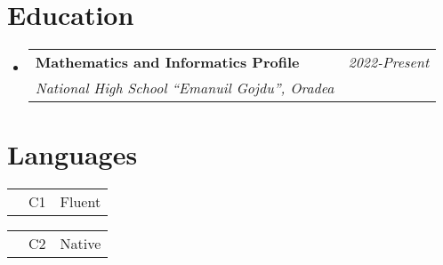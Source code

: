 \documentclass[a4paper,11pt]{article}
\makeatletter
\newcommand{\resumeSubheading}[4]{
\vspace{0.5mm}\item
    \begin{tabular*}{0.98\textwidth}[t]{l@{\extracolsep{\fill}}r}
        \textbf{#1} & \textit{\footnotesize{#4}} \\
        \textit{\footnotesize{#3}} &  \footnotesize{#2}\\
    \end{tabular*}
    \vspace{-2.4mm}
}
\newcommand{\resumeSubHeadingListStart}{\begin{itemize}[leftmargin=*,labelsep=0mm]}
\newcommand{\resumeSubHeadingListEnd}{\end{itemize}\vspace{2mm}}
\makeatother
\begin{document}
\section{\textbf{Education}}
\resumeSubHeadingListStart
\resumeSubheading
{Mathematics and Informatics Profile}{}
{National High School ``Emanuil Gojdu'', Oradea}{2022-Present}
\resumeSubHeadingListEnd
\vspace{-5.5mm}

\section{\textbf{Languages}}
\vspace{-0.4mm}
\begin{center}
    \begin{multicols}{2}
        \begin{tabularx}{6.6cm}{>{\raggedright\arraybackslash}X  >{\raggedright\arraybackslash}X  >{\raggedright\arraybackslash}X}
            {\bf English } & C1 & \hspace{-1.4cm}Fluent     \\
        \end{tabularx}
        \begin{tabularx}{6.1cm}{>{\raggedright\arraybackslash}X  >{\raggedright\arraybackslash}X  >{\raggedright\arraybackslash}X}
            {\bf Romanian} & C2 & \hspace{-1.4cm}Native     \\
        \end{tabularx}

    \end{multicols}
\end{center}

\vspace{-5mm}
\end{document}
